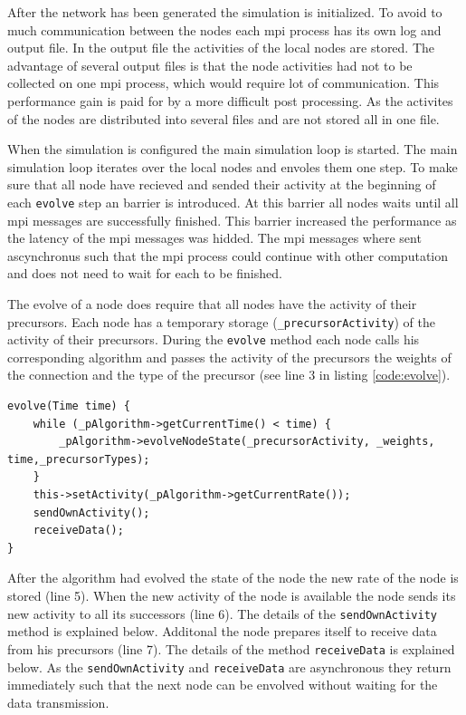 \documentclass[12pt]{article}
\begin{document}
After the network has been generated the simulation is initialized.
To avoid to much communication between the nodes each mpi process has its own log and output file.
In the output file the activities of the local nodes are stored.
The advantage of several output files is that the node activities had not to be collected on one mpi process, which would require lot of communication.
This performance gain is paid for by a more difficult post processing. 
As the activites of the nodes are distributed into several files and are not stored all in one file.

When the simulation is configured the main simulation loop is started.
The main simulation loop iterates over the local nodes and envoles them one step.
To make sure that all node have recieved and sended their activity at the beginning of each \texttt{evolve} step an barrier is introduced.
At this barrier all nodes waits until all mpi messages are successfully finished.
This barrier increased the performance as the latency of the mpi messages was hidded.
The mpi messages where sent ascynchronus such that the mpi process could continue with other computation and does not need to wait for each to be finished.

The evolve of a node does require that all nodes have the activity of their precursors.
Each node has a temporary storage (\texttt{\_precursorActivity}) of the activity of their precursors.
During the \texttt{evolve} method each node calls his corresponding algorithm and passes the activity of the precursors the weights of the connection and the type of the precursor (see line 3 in listing \ref{code:evolve}).


\begin{lstlisting}[caption=The simplified \texttt{evolve} method of the nodes.,label=code:evolve]
evolve(Time time) {
	while (_pAlgorithm->getCurrentTime() < time) {
		_pAlgorithm->evolveNodeState(_precursorActivity, _weights, time,_precursorTypes);
	}
	this->setActivity(_pAlgorithm->getCurrentRate());
	sendOwnActivity();
	receiveData();
}
\end{lstlisting}

After the algorithm had evolved the state of the node the new rate of the node is stored (line 5).
When the new activity of the node is available the node sends its new activity to all its successors (line 6).
The details of the \texttt{sendOwnActivity} method is explained below.
Additonal the node prepares itself to receive data from his precursors (line 7).
The details of the method \texttt{receiveData} is explained below.
As the  \texttt{sendOwnActivity} and  \texttt{receiveData} are asynchronous they return immediately such that the next node can be envolved without waiting for the data transmission.
\end{document}
